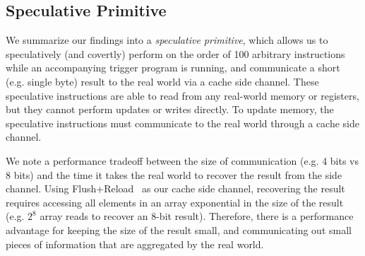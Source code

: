 \subsection{Speculative Primitive}

We summarize our findings into a \emph{speculative primitive}, which allows us to
speculatively (and covertly) perform on the order of 100 arbitrary
instructions while an accompanying trigger program is running, and communicate
a short (e.g. single byte) result to the real
world via a cache side channel. These speculative instructions are able to read
from any real-world memory or registers, but they cannot perform updates or
writes directly. To update memory, the speculative instructions must communicate
to the real world through a cache side channel.

We note a performance tradeoff between the size of communication (e.g. 4 bits vs 8
bits) and the time it takes the real world to recover the result from the side
channel. Using Flush+Reload~\cite{yarom2014flush+} as our cache side channel,
recovering the result requires accessing all elements in an array exponential in
the size of the result (e.g. $2^8$ array reads to recover an 8-bit result). 
Therefore, there is a
performance advantage for keeping the size of the result small, and communicating
out small pieces of information that are aggregated by the real world.


